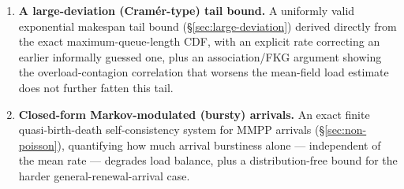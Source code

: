 \documentclass[11pt,a4paper]{report}
\begin{document}
\begin{enumerate}
        DTA as $W \to \infty$ (heavy-traffic information-optimality); and a
        quantitative $\Omega(\log N)$ cost advantage over WS on NUMA
        topologies, with a practitioner methodology for computing the
        DTA/WS crossover threshold $\gamma^*$ on target hardware.
  \item \textbf{A large-deviation (Cram\'er-type) tail bound.}
        A uniformly valid exponential makespan tail bound
        (\S\ref{sec:large-deviation}) derived directly from the exact
        maximum-queue-length CDF, with an explicit rate correcting an
        earlier informally guessed one, plus an association/FKG argument
        showing the overload-contagion correlation that worsens the
        mean-field load estimate does not further fatten this tail.
  \item \textbf{Closed-form Markov-modulated (bursty) arrivals.}
        An exact finite quasi-birth-death self-consistency system for
        MMPP arrivals (\S\ref{sec:non-poisson}), quantifying how much
        arrival burstiness alone --- independent of the mean rate ---
        degrades load balance, plus a distribution-free bound for the
        harder general-renewal-arrival case.
\end{enumerate}
\end{document}
